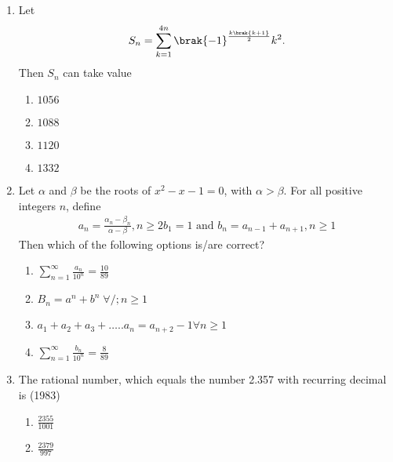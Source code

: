\begin{enumerate}[label=\thesubsection.\arabic*,ref=\thesubsection.\theenumi]
	  \hfill (2018)
	  \begin{multicols}{4}
\begin{enumerate}    
  \item {248} \item{464}
  \item{496}
  \item{232}
  \end{enumerate}
\end{multicols}
%
\item Let \begin{align*} S_n=\sum_{k=1}^{4n}\brak{-1}^\frac{k\brak{k+1}}{2}k^2.\end{align*}  Then $S_n$ can take value  \hfill{}
\begin{multicols}{4}
\begin{enumerate}    
\item $1056$
\item $1088$
\item $1120$
\item $1332$
\end{enumerate}
\end{multicols}
%
\item Let $\alpha$ and $\beta$ be the roots of $x^2-x-1=0$,  with $\alpha>\beta$. For all positive integers $n$,  define
\begin{align*}
a_n=\frac{\alpha_n-\beta_n}{\alpha-\beta}, n\geq2
b_1=1  \text{ and }  b_n=a_{n-1}+a_{n+1}, n\geq1
\end{align*}
Then which of the following options is/are correct?
\hfill{}
\begin{multicols}{4}
\begin{enumerate}    
\item $\sum_{n=1}^{\infty}\frac{a_n}{10^n}=\frac{10}{89}$
\item $B_n=a^n+b^n \;  \forall /;  n\geq1$
\item $a_1+a_2+a_3+\dots..a_n=a_{n+2}-1 \forall n\geq1$
\item $\sum_{n=1}^{\infty}\frac{b_n}{10^n}=\frac{8}{89}$
\end{enumerate}
\end{multicols}
%
	\item The rational number,  which equals the number 2.357 with recurring decimal is 
		\hfill{(1983)}
    \begin{multicols}{4}
\begin{enumerate}     \itemsep 1ex
        \item $\frac{2355}{1001}$ 
        \item $\frac{2379}{997}$ 

\end{enumerate}
\end{multicols}
\end{enumerate}
